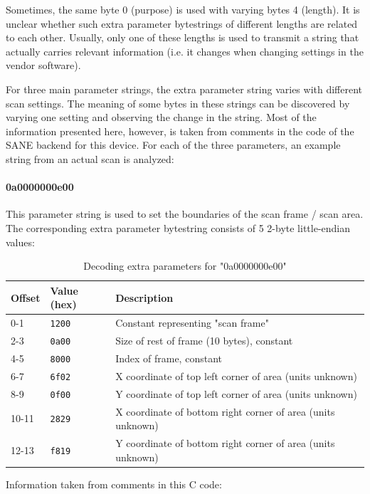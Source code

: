 \documentclass{article}
\begin{document}
Sometimes, the same byte 0 (purpose) is used with varying bytes 4 (length).
It is unclear whether such extra parameter bytestrings of different lengths
are related to each other. Usually, only one of these lengths is used to transmit
a string that actually carries relevant information (i.e. it changes when
changing settings in the vendor software).

For three main parameter strings, the extra parameter string varies
with different scan settings. The meaning of some bytes in these strings
can be discovered by varying one setting and observing the change in the
string. Most of the information presented here, however,
is taken from comments in the code of the SANE backend for this device.
For each of the three parameters, an example string from an actual
scan is analyzed:

\paragraph{0a0000000e00}

This parameter string is used to set the boundaries of the scan
frame / scan area. The corresponding extra parameter bytestring
consists of 5 2-byte little-endian values:

\begin{table}[H]
  \caption{Decoding extra parameters for "0a0000000e00"}
  \centering
  \begin{tabularx}{\textwidth}{p{1cm} | p{1cm} | X}
    Offset & Value (hex) & Description \\ \hline
    0-1 & {\tt 1200} & Constant representing "scan frame" \\
    2-3 & {\tt 0a00} & Size of rest of frame (10 bytes), constant \\
    4-5 & {\tt 8000} & Index of frame, constant \\
    6-7 & {\tt 6f02} & X coordinate of top left corner of area (units unknown) \\
    8-9 & {\tt 0f00} & Y coordinate of top left corner of area (units unknown) \\
    10-11 & {\tt 2829} & X coordinate of bottom right corner of area (units unknown) \\
    12-13 & {\tt f819} & Y coordinate of bottom right corner of area (units unknown) \\
  \end{tabularx}
  
  \vspace{5mm}
  Information taken from comments in this C code: \cite[\texttt{pieusb\_scancmd.c}]{sane_code}
  \label{table:param0a}
\end{table}
\end{document}
